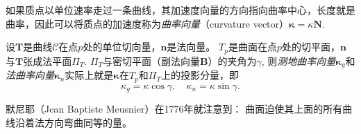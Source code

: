 \documentclass{article}
\begin{document}
如果质点以单位速率走过一条曲线，其加速度向量的方向指向曲率中心，长度就是曲率，因此可以将质点的加速度称为\emph{曲率向量}（curvature vector）$\mathbf{\kappa}=\kappa\mathbf{N}$.

设$\mathbf{T}$是曲线$\mathcal{C}$在点$p$处的单位切向量，$\mathbf{n}$是法向量。
$T_{p}$是曲面在点$p$处的切平面，$\mathbf{n}$与$\mathbf{T}$张成法平面$\Pi_{T}$.
$\Pi_{T}$与密切平面（副法向量$\mathbf{B}$）的夹角为$\gamma$, 则\emph{测地曲率向量}$\mathbf{\kappa}_{g}$和\emph{法曲率向量}$\mathbf{\kappa}_{n}$实际上就是$\mathbf{\kappa}$在$T_{p}$和$\Pi_{T}$上的投影分量，即
\begin{equation}
    \kappa_{g}=\kappa\cos\gamma, \quad
    \kappa_{n}=\kappa\sin\gamma.
\end{equation}

默尼耶（Jean Baptiste Meusnier）在1776年就注意到：
曲面迫使其上面的所有曲线沿着法方向弯曲同等的量。

%
%
\end{document}
